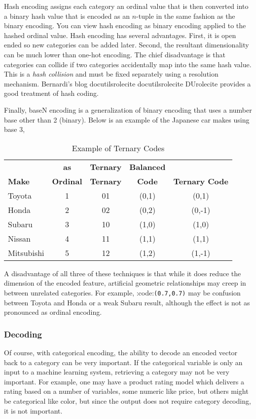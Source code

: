 \documentclass[]{article}
\providecommand*{\DUrole}[2]{%
  \ifcsname docutilsrole#1\endcsname%
    \csname docutilsrole#1\endcsname{#2}%
  \else
    \csname DUrole#1\endcsname{#2}%
  \fi%
}
\begin{document}
Hash encoding assigns each category an ordinal value that is then
converted into a binary hash value that is encoded as an $n$-tuple
in the same fashion as the binary encoding. You can view hash encoding
as binary encoding applied to the hashed ordinal value. Hash encoding
has several advantages. First, it is open ended so new categories can be
added later. Second, the resultant dimensionality can be much lower than
one-hot encoding. The chief disadvantage is that categories can collide
if two categories accidentally map into the same hash value. This is a
\emph{hash collision} and must be fixed separately using a resolution
mechanism. Bernardi's blog \DUrole{cite}{hash} provides a good treatment of hash coding.

Finally, baseN encoding is a generalization of binary encoding that uses
a number base other than 2 (binary). Below is an example of the Japanese
car makes using base 3,
\begin{table}
  \begin{longtable*}{lcccc}
  \toprule
  & \textbf{as} & \textbf{Ternary} & \textbf{Balanced} \\
  \textbf{Make} & \textbf{Ordinal} & \textbf{Ternary} & \textbf{Code} & \textbf{Ternary Code} \\
  \midrule
  \endfirsthead
  Toyota & 1 & 01 & (0,1) & (0,1) \\
  Honda & 2 & 02 & (0,2) & (0,-1) \\
  Subaru & 3 & 10 & (1,0) & (1,0) \\
  Nissan & 4 & 11 & (1,1) & (1,1) \\
  Mitsubishi & 5 & 12 & (1,2) & (1,-1) \\
  \bottomrule
  \end{longtable*}
  \caption{Example of Ternary Codes}
\end{table}


A disadvantage of all three of these techniques is that while it does
reduce the dimension of the encoded feature, artificial geometric
relationships may creep in between unrelated categories. For example,
:code:\texttt{(0.7,0.7)} may be confusion between Toyota and Honda or a weak Subaru
result, although the effect is not as pronounced as ordinal encoding.

\subsubsection{Decoding%
  \label{decoding}%
}


Of course, with categorical encoding, the ability to decode an encoded vector back to a category can be very important. If the categorical variable is only an input to a machine learning system, retrieving a category may not be very important. For example, one may have a product rating model which delivers a rating based on a number of variables, some numeric like price, but others might be categorical like color, but since the output does not require category decoding, it is not important.
\end{document}
